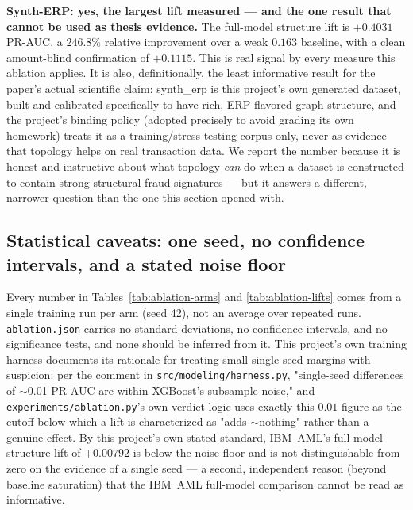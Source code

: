 \textbf{Synth-ERP: yes, the largest lift measured — and the one result that cannot be used as thesis evidence.} The full-model structure lift is $+0.4031$ PR-AUC, a $246.8\%$ relative improvement over a weak $0.163$ baseline, with a clean amount-blind confirmation of $+0.1115$. This is real signal by every measure this ablation applies. It is also, definitionally, the least informative result for the paper's actual scientific claim: synth\_erp is this project's own generated dataset, built and calibrated specifically to have rich, ERP-flavored graph structure, and the project's binding policy (adopted precisely to avoid grading its own homework) treats it as a training/stress-testing corpus only, never as evidence that topology helps on real transaction data. We report the number because it is honest and instructive about what topology \emph{can} do when a dataset is constructed to contain strong structural fraud signatures — but it answers a different, narrower question than the one this section opened with.

\subsection{Statistical caveats: one seed, no confidence intervals, and a stated noise floor}\label{sec:ablation-stats}
Every number in Tables~\ref{tab:ablation-arms} and \ref{tab:ablation-lifts} comes from a single training run per arm (seed 42), not an average over repeated runs. \texttt{ablation.json} carries no standard deviations, no confidence intervals, and no significance tests, and none should be inferred from it. This project's own training harness documents its rationale for treating small single-seed margins with suspicion: per the comment in \texttt{src/modeling/harness.py}, "single-seed differences of $\sim$0.01 PR-AUC are within XGBoost's subsample noise," and \texttt{experiments/ablation.py}'s own verdict logic uses exactly this $0.01$ figure as the cutoff below which a lift is characterized as "adds $\sim$nothing" rather than a genuine effect. By this project's own stated standard, IBM~AML's full-model structure lift of $+0.00792$ is below the noise floor and is not distinguishable from zero on the evidence of a single seed — a second, independent reason (beyond baseline saturation) that the IBM~AML full-model comparison cannot be read as informative.

